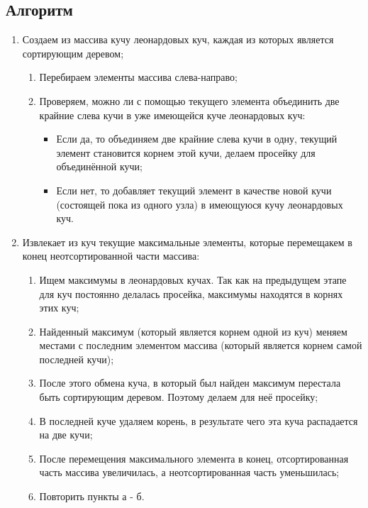 	\subsection*{Алгоритм}

	\begin{enumerate} \label{alg:SmoothSort}

		\item Создаем из массива кучу леонардовых куч, каждая из которых является сортирующим деревом;

			\begin{enumerate}
			\item Перебираем элементы массива слева-направо;
			\item Проверяем, можно ли с помощью текущего элемента объединить две крайние слева кучи в уже имеющейся куче леонардовых куч:

				\begin{itemize}
					\item Если да, то объединяем две крайние слева кучи в одну, текущий элемент становится корнем этой кучи, делаем просейку для объединённой кучи;
					\item Если нет, то добавляет текущий элемент в качестве новой кучи (состоящей пока из одного узла) в имеющуюся кучу леонардовых куч.
				\end{itemize}

			\end{enumerate}

		\item Извлекает из куч текущие максимальные элементы, которые перемещакем в конец неотсортированной части массива:

			\begin{enumerate}
			\item Ищем максимумы в леонардовых кучах. Так как на предыдущем этапе для куч постоянно делалась просейка, максимумы находятся в корнях этих куч;
			\item Найденный максимум (который является корнем одной из куч) меняем местами с последним элементом массива (который является корнем самой последней кучи);
			\item После этого обмена куча, в который был найден максимум перестала быть сортирующим деревом. Поэтому делаем для неё просейку;
			\item В последней куче удаляем корень, в результате чего эта куча распадается на две кучи;
			\item После перемещения максимального элемента в конец, отсортированная часть массива увеличилась, а неотсортированная часть уменьшилась;
			\item Повторить пункты а - б.
			\end{enumerate}

	\end{enumerate}
